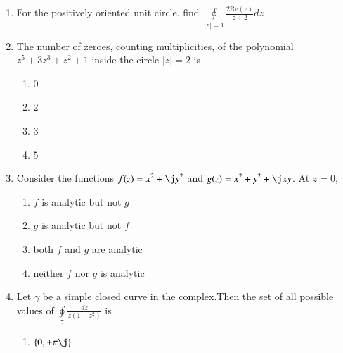 \documentclass[journal,12pt,twocolumn]{IEEEtran}
\begin{document}
\begin{enumerate}[1.]
\item For the positively oriented unit circle, find $\oint\limits_{\mid z \mid = 1 } \frac{2 \text{Re}(z)}{z+2} dz $
 
%
%
%
%
%

\item The number of zeroes, counting multiplicities, of the polynomial $z^5+3z^3+z^2+1$ inside the circle $ \mid z \mid =2 $ is


\begin{enumerate}

\item $
0
$

\item $
2
$

\item $
3
$

\item $
5
$

\end{enumerate}


\item Consider the functions $f(z)=x^2+\j y^2$ and $g(z)=x^2+y^2+ \j x y$. At $z=0$,

\begin{enumerate}

\item
$f$ is analytic but not $g$

\item
$g$ is analytic but not $f$

\item
both $f$ and $g$ are analytic

\item
neither $f$ nor $g$ is analytic


\end{enumerate}


\item Let $\gamma$ be a simple closed curve in the complex.Then the set of all possible values of
$\oint\limits_{\gamma} \frac{dz}{z(1-z^2)}$ is

\begin{enumerate}

\item $
\lbrace 0, \pm \pi \j \rbrace
$


\end{enumerate}
\end{enumerate}
\end{document}
